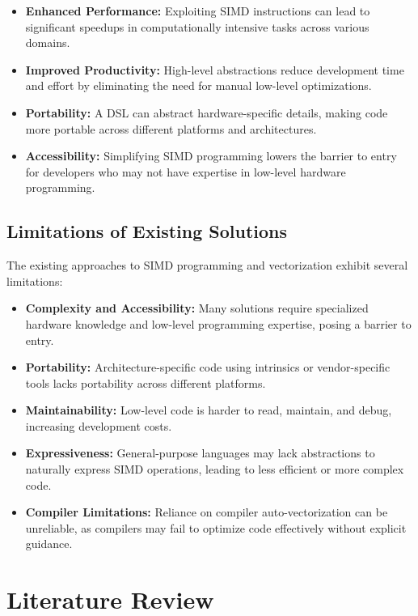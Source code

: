 \documentclass[12pt,a4paper]{article}
\begin{document}
\begin{itemize}
    \item \textbf{Enhanced Performance:} Exploiting SIMD instructions can lead to significant speedups in computationally intensive tasks across various domains.
    \item \textbf{Improved Productivity:} High-level abstractions reduce development time and effort by eliminating the need for manual low-level optimizations.
    \item \textbf{Portability:} A DSL can abstract hardware-specific details, making code more portable across different platforms and architectures.
    \item \textbf{Accessibility:} Simplifying SIMD programming lowers the barrier to entry for developers who may not have expertise in low-level hardware programming.
\end{itemize}

\subsection{Limitations of Existing Solutions}

The existing approaches to SIMD programming and vectorization exhibit several limitations:

\begin{itemize}
    \item \textbf{Complexity and Accessibility:} Many solutions require specialized hardware knowledge and low-level programming expertise, posing a barrier to entry.
    \item \textbf{Portability:} Architecture-specific code using intrinsics or vendor-specific tools lacks portability across different platforms.
    \item \textbf{Maintainability:} Low-level code is harder to read, maintain, and debug, increasing development costs.
    \item \textbf{Expressiveness:} General-purpose languages may lack abstractions to naturally express SIMD operations, leading to less efficient or more complex code.
    \item \textbf{Compiler Limitations:} Reliance on compiler auto-vectorization can be unreliable, as compilers may fail to optimize code effectively without explicit guidance.
\end{itemize}

\section{Literature Review}
\end{document}

